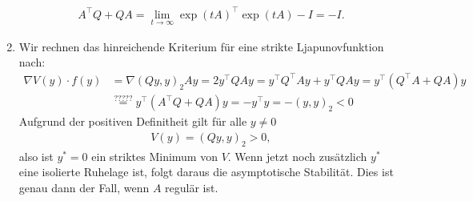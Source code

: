 \begin{solution}
\begin{enumerate}[label = \textbf{\alph*)}]
\begin{align*}
    A^{\top}Q + QA = \lim_{t \to \infty} \exp(tA)^{\top}\exp(tA) - I = -I.
  \end{align*}
  \item Wir rechnen das hinreichende Kriterium für eine strikte Ljapunovfunktion nach:
  \begin{align*}
    \nabla V(y) \cdot f(y) &= \nabla (Qy,y)_2 Ay = 2y^{\top}Q Ay =
    y^{\top}Q^{\top} Ay + y^{\top}Q Ay = y^{\top}(Q^{\top}A + QA)y \\
    &\stackrel{?????}{=} y^{\top}(A^{\top}Q + QA)y = - y^{\top}y = -(y,y)_2 < 0
  \end{align*}
  Aufgrund der positiven Definitheit gilt für alle $y \neq 0$
  \begin{align*}
    V(y) = (Qy,y)_2 > 0,
  \end{align*}
  also ist $y^* = 0$ ein striktes Minimum von $V$. Wenn jetzt noch zusätzlich $y^*$
  eine isolierte Ruhelage ist, folgt daraus die asymptotische Stabilität.
  Dies ist genau dann der Fall, wenn $A$ regulär ist.
\end{enumerate}
\end{solution}
